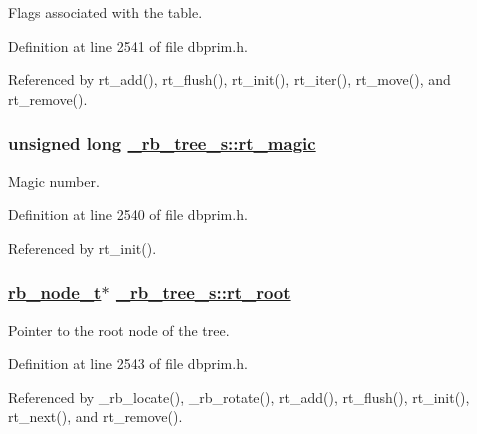 Flags associated with the table. 

Definition at line 2541 of file dbprim.h.

Referenced by rt\_\-add(), rt\_\-flush(), rt\_\-init(), rt\_\-iter(), rt\_\-move(), and rt\_\-remove().\hypertarget{struct__rb__tree__s_o0}{
\subsubsection[rt\_\-magic]{\setlength{\rightskip}{0pt plus 5cm}unsigned long \hyperlink{struct__rb__tree__s_o0}{\_\-rb\_\-tree\_\-s::rt\_\-magic}}}
\label{struct__rb__tree__s_o0}


Magic number. 

Definition at line 2540 of file dbprim.h.

Referenced by rt\_\-init().\hypertarget{struct__rb__tree__s_o3}{
\subsubsection[rt\_\-root]{\setlength{\rightskip}{0pt plus 5cm}\hyperlink{struct__rb__node__s}{rb\_\-node\_\-t}$\ast$ \hyperlink{struct__rb__tree__s_o3}{\_\-rb\_\-tree\_\-s::rt\_\-root}}}
\label{struct__rb__tree__s_o3}


Pointer to the root node of the tree. 

Definition at line 2543 of file dbprim.h.

Referenced by \_\-rb\_\-locate(), \_\-rb\_\-rotate(), rt\_\-add(), rt\_\-flush(), rt\_\-init(), rt\_\-next(), and rt\_\-remove().